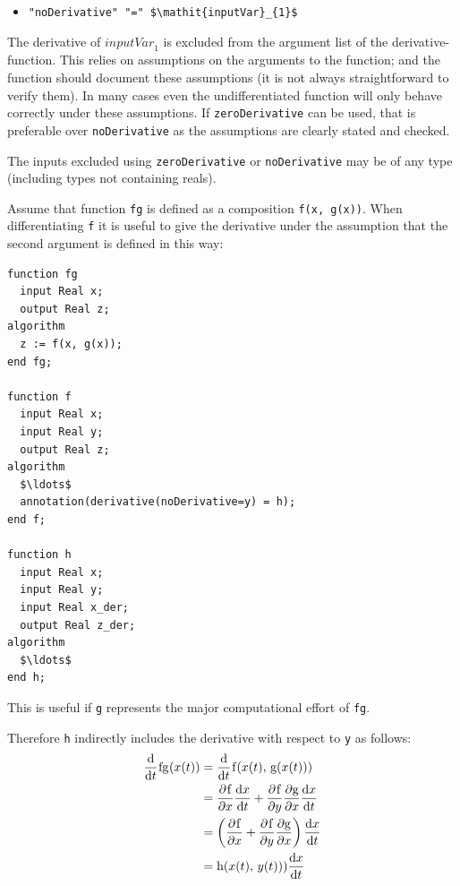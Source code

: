 \begin{itemize}
\item
  {\lstinline[language=grammar]!"noDerivative" "=" $\mathit{inputVar}_{1}$!}
\end{itemize}

The derivative of $\mathit{inputVar}_{1}$ is excluded from the argument list of the derivative-function.
This relies on assumptions on the arguments to the function; and the function should document these assumptions (it is not always straightforward to verify them).
In many cases even the undifferentiated function will only behave correctly under these assumptions.
If {\lstinline!zeroDerivative!} can be used, that is preferable over {\lstinline!noDerivative!} as the assumptions are clearly stated and checked.

The inputs excluded using {\lstinline!zeroDerivative!} or {\lstinline!noDerivative!} may be of any type (including types not containing reals).

\begin{nonnormative}
Assume that function {\lstinline!fg!} is defined as a composition {\lstinline!f(x, g(x))!}.
When differentiating {\lstinline!f!} it is useful to give the derivative under the assumption that the second argument is defined in this way:
\begin{lstlisting}[language=modelica]
function fg
  input Real x;
  output Real z;
algorithm
  z := f(x, g(x));
end fg;

function f
  input Real x;
  input Real y;
  output Real z;
algorithm
  $\ldots$
  annotation(derivative(noDerivative=y) = h);
end f;

function h
  input Real x;
  input Real y;
  input Real x_der;
  output Real z_der;
algorithm
  $\ldots$
end h;
\end{lstlisting}
This is useful if {\lstinline!g!} represents the major computational effort of {\lstinline!fg!}.

Therefore {\lstinline!h!} indirectly includes the derivative with respect to {\lstinline!y!} as follows:
\begin{equation*}
\begin{aligned}
\udfrac{}{t}\text{{\lstinline!fg!}}(x(t))
&= \udfrac{}{t}\text{{\lstinline!f!}}(x(t),\, \text{{\lstinline!g!}}(x(t)))\\
&= \pdfrac{\text{{\lstinline!f!}}}{x} \udfrac{x}{t} + \pdfrac{\text{{\lstinline!f!}}}{y} \pdfrac{\text{{\lstinline!g!}}}{x} \udfrac{x}{t}\\
&= \left(\pdfrac{\text{{\lstinline!f!}}}{x} + \pdfrac{\text{{\lstinline!f!}}}{y} \pdfrac{\text{{\lstinline!g!}}}{x} \right) \udfrac{x}{t}\\
&= \text{{\lstinline!h!}}(x(t),\, y(t))) \udfrac{x}{t}
\end{aligned}
\end{equation*}
\end{nonnormative}



